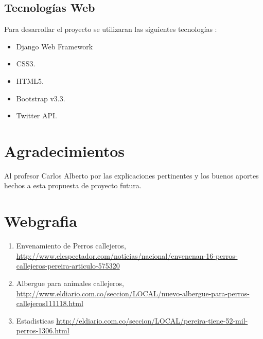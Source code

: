 \documentclass[paper=a4, fontsize=12pt]{article} 		%
\numberwithin{equation}{section}						%
\numberwithin{table}{section} 							%
\begin{document}
\subsection{Tecnologías Web}
Para desarrollar el proyecto se utilizaran las siguientes tecnologías :
\begin{itemize}
  \item Django Web Framework
  \item CSS3.
  \item HTML5.
  \item Bootstrap v3.3.
  \item Twitter API. 
\end{itemize}
\section{Agradecimientos}
Al profesor Carlos Alberto por las explicaciones pertinentes y los buenos aportes hechos a esta propuesta de proyecto futura.
\section{Webgrafia}
\begin{enumerate}
	\item Envenamiento de Perros callejeros, \url{http://www.elespectador.com/noticias/nacional/envenenan-16-perros-callejeros-pereira-articulo-575320}
	\item Albergue para animales callejeros, \url{http://www.eldiario.com.co/seccion/LOCAL/nuevo-albergue-para-perros-callejeros111118.html}
	\item Estadisticas \url{http://eldiario.com.co/seccion/LOCAL/pereira-tiene-52-mil-perros-1306.html}
\end{enumerate}
\end{document}
